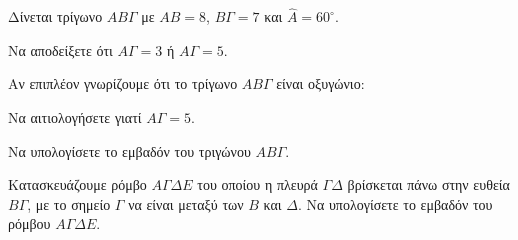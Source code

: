 \begin{figure}
    \centering
\end{figure}
Δίνεται τρίγωνο $ΑΒΓ$ με $ΑΒ = 8$, $ΒΓ = 7$ και $\hat{Α} = 60^\circ$.
\begin{alist}
    \item [α)] Να αποδείξετε ότι $ΑΓ = 3$ ή $ΑΓ = 5$. 
    \item [β)] Αν επιπλέον γνωρίζουμε ότι το τρίγωνο $ΑΒΓ$ είναι οξυγώνιο:
    \begin{rlist}
        \item Να αιτιολογήσετε γιατί $ΑΓ = 5$. 
        \item Να υπολογίσετε το εμβαδόν του τριγώνου $ΑΒΓ$. 
        \item Κατασκευάζουμε ρόμβο $ΑΓΔΕ$ του οποίου η πλευρά $ΓΔ$ βρίσκεται πάνω στην ευθεία $ΒΓ$, με το σημείο $Γ$ να είναι μεταξύ των $Β$ και $Δ$. Να υπολογίσετε το εμβαδόν του ρόμβου $ΑΓΔΕ$. 
    \end{rlist}
\end{alist}